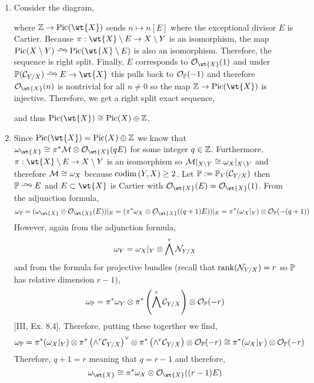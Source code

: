\documentclass[12pt]{article}
\begin{document}
\begin{enumerate}
\item Consider the diagram,
\begin{center}
\end{center}
where $\Z \to \Pic{\wt{X}}$ sends $n \mapsto n [E]$ where the exceptional divisor $E$ is Cartier. 
Because $\pi : \wt{X} \setminus E \to X \setminus Y$ is an isomorphism, the map $\Pic{X \setminus Y} \iso \Pic{\wt{X} \setminus E}$ is also an isomorphism. Therefore, the sequence is right split. Finally, $E$ corresponds to $\struct{\wt{X}}(1)$ and under $\P(\C_{Y/X}) \iso E \to \wt{X}$ this pulls back to $\struct{\P}(-1)$ and therefore $\struct{\wt{X}}(n)$ is nontrivial for all $n \neq 0$ so the map $\Z \to \Pic{\wt{X}}$ is injective. Therefore, we get a right split exact sequence,
\begin{center}
\end{center}
and thus $\Pic{\wt{X}} \cong \Pic{X} \oplus \Z$.

\item Since $\Pic{\wt{X}} = \Pic{X} \oplus \Z$ we know that $\omega_{\wt{X}} \cong \pi^* \M \ot \struct{\wt{X}}(q E)$ for some integer $q \in \Z$. Furthermore, $\pi : \wt{X} \setminus E \to X \setminus Y$ is an isomorphism so $\M|_{X\setminus Y} \cong \omega_X |_{X \setminus Y}$ and therefore $\M \cong \omega_X$ because $\codim{Y, X} \ge 2$. Let $\P := \P_Y(\C_{Y/X})$ then $\P \iso E$ and $E \subset \wt{X}$ is Cartier with $\struct{\wt{X}}(E) = \struct{\wt{X}}(1)$. From the adjunction formula,
\[ \omega_{\P} = (\omega_{\wt{X}} \ot \struct{\wt{X}}(E))|_E = (\pi^* \omega_X \ot \struct{\wt{X}}((q+1)E))|_E = \pi^* (\omega_X |_Y) \ot \struct{\P}(-(q+1)) \]
However, again from the adjunction formula,
\[ \omega_Y = \omega_X |_Y \ot \bigwedge^{r} \sN_{Y/X} \]
and from the formula for projective bundles (recall that $\rank(\sN_{Y/X}) = r$ so $\P$ has relative dimension $r-1$),
\[ \omega_{\P} = \pi^* \omega_Y \ot \pi^* \left( \bigwedge^{r} \C_{Y/X} \right) \ot \struct{\P}(-r) \]
[III, Ex. 8.4]. Therefore, putting these togerther we find,
\[ \omega_{\P} = \pi^* (\omega_X |_Y) \ot \pi^* \left( \wedge^r \C_{Y/X} \right)^\vee \otimes \pi^* \left( \wedge^r \C_{Y/X} \right) \ot \struct{\P}(-r) \cong \pi^* (\omega_X|_Y) \ot \struct{\P}(-r) \]
Therefore, $q + 1 = r$ meaning that $q = r - 1$ and therefore,
\[ \omega_{\wt{X}} \cong \pi^* \omega_X \ot \struct{\wt{X}}((r-1)E) \]



\end{enumerate}
\end{document}
